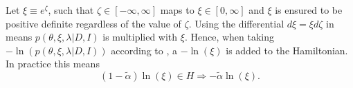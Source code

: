 \begin{example}
	Let $\xi \equiv e^\zeta$, such that $\zeta\in [-\infty,\infty]$ maps to $\xi\in[0,\infty]$ and $\xi$ is ensured to be positive definite regardless of the value of $\zeta$. Using the differential $d\xi =  \xi d\zeta$ in  means $p(\theta,\xi,\lambda|D,I)$ is multiplied with $\xi$. Hence, when taking $-\ln(p(\theta,\xi,\lambda|D,I))$ according to , a $-\ln(\xi)$ is added to the Hamiltonian. In practice this means
	\begin{equation}
		(1-\tilde{\alpha})\ln(\xi)\in H\Rightarrow -\tilde{\alpha}\ln(\xi).
	\end{equation} 	
\end{example}


